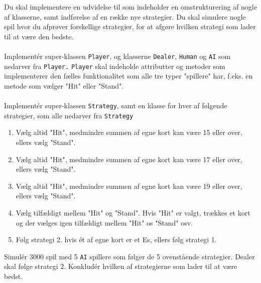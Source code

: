 Du skal implementere en udvidelse til \sbl som indeholder en omstrukturering af nogle af klasserne, samt indførelse af en række nye strategier. Du skal simulere nogle \sbl spil hvor du afprøver forskellige strategier, for at afgøre
  hvilken strategi som lader til at være den bedste. \\ \\
  Implement\'{e}r super-klassen \texttt{Player}, og klasserne \texttt{Dealer}, \texttt{Human} og \texttt{AI} som nedarver fra \texttt{Player.} \texttt{Player} skal indeholde attributter og metoder som implementerer den fælles funktionalitet
  som alle tre typer "spillere" har, f.eks. en metode som vælger "Hit" eller "Stand". \\ \\
  Implement\'{e}r super-klassen \texttt{Strategy}, samt en klasse for hver af følgende strategier, som alle nedarver fra \texttt{Strategy}
  \begin{enumerate}
  \item Vælg altid "Hit", medmindre summen af egne kort kan være 15 eller over, ellers vælg "Stand".
  \item Vælg altid "Hit", medmindre summen af egne kort kan være 17 eller over, ellers vælg "Stand".
  \item Vælg altid "Hit", medmindre summen af egne kort kan være 19 eller over, ellers vælg "Stand".
  \item Vælg tilfældigt mellem "Hit" og "Stand". Hvis "Hit" er valgt, trækkes et kort og der vælges igen tilfældigt mellem
    "Hit" os "Stand" osv.
  \item Følg strategi 2. hvis \'{e}t af egne kort er et Es, ellers følg strategi 1.
  \end{enumerate}
  Simul\'{e}r 3000 spil \sbl med 5 \texttt{AI} spillere som følger de 5 ovenstående strategier.
  Dealer skal følge strategi 2. 
  Konklud\'{e}r hvilken af strategierne som lader til at være bedst. \\ \\
